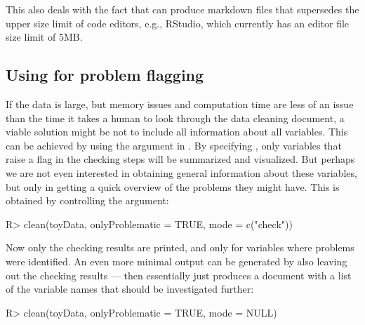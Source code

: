 \documentclass[article,shortnames]{jss}
\newcommand{\hl}[1]{\textcolor{magenta}{#1}}
\begin{document}
This also deals with the fact that  can produce
 markdown files that supersedes the upper size limit of code editors, e.g.,
RStudio, which currently has an editor file size limit of 5MB. %

\subsection[Using dataMaid for problem flagging]{Using  for problem flagging}
If the data is large, but memory issues and computation time are less
of an issue than the time it takes a human to look through the data
cleaning document, a viable solution might be not to include all
information about all variables. %
This can be achieved by using the  argument in
. By specifying , only
variables that raise a flag in the checking steps will be summarized
and visualized. But perhaps we are not even interested in obtaining
general information about these variables, but only in getting a quick
overview of the problems they might have. This is obtained by
controlling the  argument:

\begin{Schunk}
\begin{Sinput}
R> clean(toyData, onlyProblematic = TRUE, mode = c("check"))
\end{Sinput}
\end{Schunk}

Now only the checking results are printed, and only for variables
where problems were identified. An even more minimal output can be
generated by also leaving out the checking results --- then
 essentially just produces a document with a list of the variable names
that should be investigated further:

\begin{Schunk}
\begin{Sinput}
R> clean(toyData, onlyProblematic = TRUE, mode = NULL)
\end{Sinput}
\end{Schunk}
\end{document}
